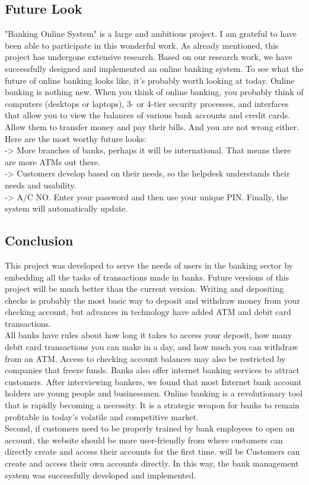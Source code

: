 \documentclass{article}
\begin{document}
\subsection{Future Look}
"Banking Online System" is a large and ambitious project. I am grateful to have been able to participate in this wonderful work. As already mentioned, this project has undergone extensive research. Based on our research work, we have successfully designed and implemented an online banking system. To see what the future of online banking looks like, it's probably worth looking at today. Online banking is nothing new. When you think of online banking, you probably think of computers (desktops or laptops), 3- or 4-tier security processes, and interfaces that allow you to view the balances of various bank accounts and credit cards. Allow them to transfer money and pay their bills. And you are not wrong either. Here are the most worthy future looks:
\\ \hfill \break -> More branches of banks, perhaps it will be international. That means there are more ATMs out there.\\ \hfill \break -> Customers develop based on their needs, so the helpdesk understands their needs and usability.\\ \hfill \break -> A/C NO. Enter your password and then use your unique PIN. Finally, the system will automatically update.
\subsection{Conclusion}
This project was developed to serve the needs of users in the banking sector by embedding all the tasks of transactions made in banks. Future versions of this project will be much better than the current version. Writing and depositing checks is probably the most basic way to deposit and withdraw money from your checking account, but advances in technology have added ATM and debit card transactions.\\ \hfill \break All banks have rules about how long it takes to access your deposit, how many debit card transactions you can make in a day, and how much you can withdraw from an ATM. Access to checking account balances may also be restricted by companies that freeze funds. Banks also offer internet banking services to attract customers. After interviewing bankers, we found that most Internet bank account holders are young people and businessmen. Online banking is a revolutionary tool that is rapidly becoming a necessity. It is a strategic weapon for banks to remain profitable in today's volatile and competitive market.\\ \hfill \break Second, if customers need to be properly trained by bank employees to open an account, the website should be more user-friendly from where customers can directly create and access their accounts for the first time. will be Customers can create and access their own accounts directly. In this way, the bank management system was successfully developed and implemented.
\newpage
\end{document}
